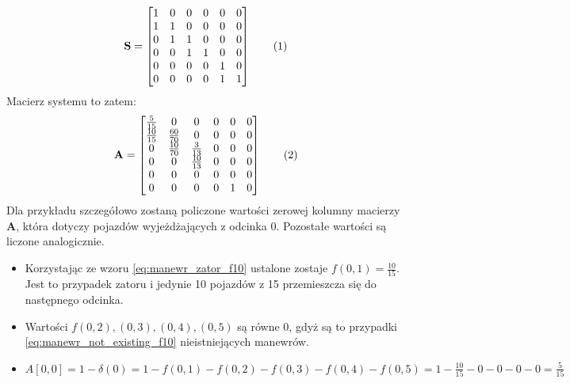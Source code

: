 \documentclass[12pt]{book}
\theoremstyle{plain}
\newcommand\addtag{\refstepcounter{equation}
\renewcommand{\labelenumii}{\theenumii}
\renewcommand{\theenumii}{\theenumi.\arabic{enumii}.}
\tag{\theequation}}
\begin{document}
\def \AcaseZero {\begin{bmatrix}
		\frac{5}{15}  & 0             & 0             & 0 & 0 & 0 \\
		\frac{10}{15} & \frac{60}{70} & 0             & 0 & 0 & 0 \\
		0          	  & \frac{10}{70} & \frac{3}{13}  & 0 & 0 & 0 \\
		0             & 0             & \frac{10}{13} & 0 & 0 & 0 \\
		0             & 0             & 0             & 0 & 0 & 0 \\
		0             & 0             & 0             & 0 & 1 & 0 
\end{bmatrix}}

\[\textbf{S}= \ScaseZero \addtag \]
Macierz systemu to zatem:
\[\textbf{A}= \AcaseZero \addtag \]
\def \utMinusI{\begin{bmatrix} 
		7 \\ 0 \\ 0 \\ 0 \\ 0 \\ 0 
\end{bmatrix}}
\def \xtMinusI{\begin{bmatrix} 
		15 \\ 70 \\ 13 \\ 7 \\ 5 \\ 18	
\end{bmatrix}}
\def \xt{\begin{bmatrix} 
		12 \\ 70 \\ 13 \\ 10 \\ 0 \\ 5	
\end{bmatrix}} \noindent
Dla przykładu szczegółowo zostaną policzone wartości zerowej kolumny macierzy $\textbf{A}$, która dotyczy pojazdów wyjeżdżających z odcinka 0. Pozostałe wartości są liczone analogicznie.
\begin{itemize}
	\item Korzystając ze wzoru \ref{eq:manewr_zator_f10} ustalone zostaje $f(0,1)=\frac{10}{15}$. Jest to przypadek zatoru i jedynie 10 pojazdów z 15 przemieszcza się do następnego odcinka.
	\item Wartości $f(0,2),(0,3),(0,4),(0,5)$ są równe $0$, gdyż są to przypadki \ref{eq:manewr_not_existing_f10} nieistniejących manewrów.
	\item $A[0,0]=1-\delta(0)=1-f(0,1)-f(0,2)-f(0,3)-f(0,4)-f(0,5)=1- \frac{10}{15} -0-0-0-0= \frac{5}{15}$
\end{itemize}
\end{document}
